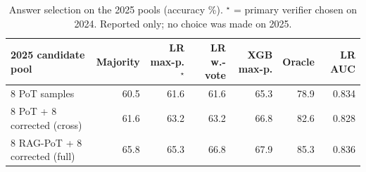 \begin{table}[t]
\centering
\footnotesize
\caption{Answer selection on the 2025 pools (accuracy \%). $^\star$ = primary verifier chosen on 2024. Reported only; no choice was made on 2025.}
\label{tab:selection}
\setlength{\tabcolsep}{3.5pt}
\begin{tabular}{lrrrrrr}
\toprule
2025 candidate pool & Majority & LR max-p.$^\star$ & LR w.-vote & XGB max-p. & Oracle & LR AUC \\
\midrule
8 PoT samples & 60.5 & 61.6 & 61.6 & 65.3 & 78.9 & 0.834 \\
8 PoT + 8 corrected (cross) & 61.6 & 63.2 & 63.2 & 66.8 & 82.6 & 0.828 \\
8 RAG-PoT + 8 corrected (full) & 65.8 & 65.3 & 66.8 & 67.9 & 85.3 & 0.836 \\
\bottomrule
\end{tabular}
\end{table}
